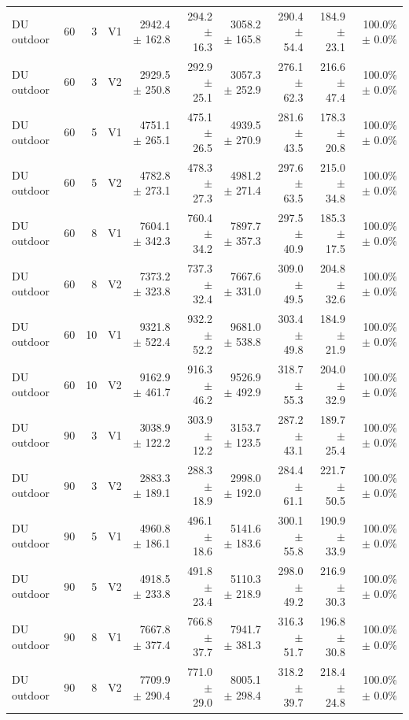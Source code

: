 \documentclass[10pt,a4paper]{article}
\begin{document}
\begin{landscape}
\begin{longtable}{@{}lrrlrrrrrr@{}}
DU outdoor & 60 & 3 & V1 & 2942.4 $\pm$ 162.8 & 294.2 $\pm$ 16.3 & 3058.2 $\pm$ 165.8 & 290.4 $\pm$ 54.4 & 184.9 $\pm$ 23.1 & 100.0\% $\pm$ 0.0\% \\
DU outdoor & 60 & 3 & V2 & 2929.5 $\pm$ 250.8 & 292.9 $\pm$ 25.1 & 3057.3 $\pm$ 252.9 & 276.1 $\pm$ 62.3 & 216.6 $\pm$ 47.4 & 100.0\% $\pm$ 0.0\% \\
DU outdoor & 60 & 5 & V1 & 4751.1 $\pm$ 265.1 & 475.1 $\pm$ 26.5 & 4939.5 $\pm$ 270.9 & 281.6 $\pm$ 43.5 & 178.3 $\pm$ 20.8 & 100.0\% $\pm$ 0.0\% \\
DU outdoor & 60 & 5 & V2 & 4782.8 $\pm$ 273.1 & 478.3 $\pm$ 27.3 & 4981.2 $\pm$ 271.4 & 297.6 $\pm$ 63.5 & 215.0 $\pm$ 34.8 & 100.0\% $\pm$ 0.0\% \\
DU outdoor & 60 & 8 & V1 & 7604.1 $\pm$ 342.3 & 760.4 $\pm$ 34.2 & 7897.7 $\pm$ 357.3 & 297.5 $\pm$ 40.9 & 185.3 $\pm$ 17.5 & 100.0\% $\pm$ 0.0\% \\
DU outdoor & 60 & 8 & V2 & 7373.2 $\pm$ 323.8 & 737.3 $\pm$ 32.4 & 7667.6 $\pm$ 331.0 & 309.0 $\pm$ 49.5 & 204.8 $\pm$ 32.6 & 100.0\% $\pm$ 0.0\% \\
DU outdoor & 60 & 10 & V1 & 9321.8 $\pm$ 522.4 & 932.2 $\pm$ 52.2 & 9681.0 $\pm$ 538.8 & 303.4 $\pm$ 49.8 & 184.9 $\pm$ 21.9 & 100.0\% $\pm$ 0.0\% \\
DU outdoor & 60 & 10 & V2 & 9162.9 $\pm$ 461.7 & 916.3 $\pm$ 46.2 & 9526.9 $\pm$ 492.9 & 318.7 $\pm$ 55.3 & 204.0 $\pm$ 32.9 & 100.0\% $\pm$ 0.0\% \\
DU outdoor & 90 & 3 & V1 & 3038.9 $\pm$ 122.2 & 303.9 $\pm$ 12.2 & 3153.7 $\pm$ 123.5 & 287.2 $\pm$ 43.1 & 189.7 $\pm$ 25.4 & 100.0\% $\pm$ 0.0\% \\
DU outdoor & 90 & 3 & V2 & 2883.3 $\pm$ 189.1 & 288.3 $\pm$ 18.9 & 2998.0 $\pm$ 192.0 & 284.4 $\pm$ 61.1 & 221.7 $\pm$ 50.5 & 100.0\% $\pm$ 0.0\% \\
DU outdoor & 90 & 5 & V1 & 4960.8 $\pm$ 186.1 & 496.1 $\pm$ 18.6 & 5141.6 $\pm$ 183.6 & 300.1 $\pm$ 55.8 & 190.9 $\pm$ 33.9 & 100.0\% $\pm$ 0.0\% \\
DU outdoor & 90 & 5 & V2 & 4918.5 $\pm$ 233.8 & 491.8 $\pm$ 23.4 & 5110.3 $\pm$ 218.9 & 298.0 $\pm$ 49.2 & 216.9 $\pm$ 30.3 & 100.0\% $\pm$ 0.0\% \\
DU outdoor & 90 & 8 & V1 & 7667.8 $\pm$ 377.4 & 766.8 $\pm$ 37.7 & 7941.7 $\pm$ 381.3 & 316.3 $\pm$ 51.7 & 196.8 $\pm$ 30.8 & 100.0\% $\pm$ 0.0\% \\
DU outdoor & 90 & 8 & V2 & 7709.9 $\pm$ 290.4 & 771.0 $\pm$ 29.0 & 8005.1 $\pm$ 298.4 & 318.2 $\pm$ 39.7 & 218.4 $\pm$ 24.8 & 100.0\% $\pm$ 0.0\% \\

\end{longtable}
\end{landscape}
\end{document}
